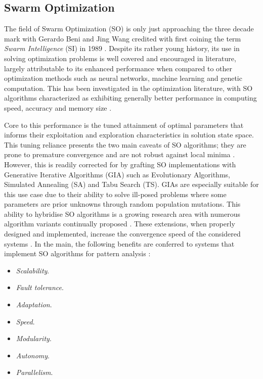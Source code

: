 \documentclass{report}
\begin{document}
\subsection{Swarm Optimization}
The field of Swarm Optimization (SO) is only just approaching the three decade mark with Gerardo Beni and Jing Wang credited with first coining the term \textit{Swarm Intelligence} (SI) in 1989 \cite{Garg2009}. Despite its rather young history, its use in solving optimization problems is well covered and encouraged in literature, largely attributable to its enhanced performance when compared to other optimization methods such as neural networks, machine learning and genetic computation. This has been investigated in the optimization literature, with SO algorithms characterized as exhibiting generally better performance in computing speed, accuracy and memory size \cite{Tran2016}.

Core to this performance is the tuned attainment of optimal parameters that informs their exploitation and exploration characteristics in solution state space. This tuning reliance presents the two main caveats of SO algorithms; they are prone to premature convergence and are not robust against local minima \cite{Cuevas2013}. However, this is readily corrected for by grafting SO implementations with Generative Iterative Algorithms (GIA) such as Evolutionary Algorithms, Simulated Annealing (SA) and Tabu Search (TS). GIAs are especially suitable for this use case due to their ability to solve ill-posed problems where some parameters are prior unknowns \cite{Youssef2001} through random population mutations. This ability to hybridise SO algorithms is a growing research area with numerous algorithm variants continually proposed \cite{Tran2016} \cite{Coello2006} \cite{Phung2017}. These extensions, when properly designed and implemented, increase the convergence speed of the considered systems \cite{Tran2016}. In the main, the following benefits are conferred to systems that implement SO algorithms for pattern analysis \cite{Cuevas2013}:
\begin{itemize}
	\item \textit{Scalability}.
	\item \textit{Fault tolerance}.
	\item \textit{Adaptation}.
	\item \textit{Speed}.
	\item \textit{Modularity}.
	\item \textit{Autonomy}.
	\item \textit{Parallelism}.
\end{itemize}
\end{document}
